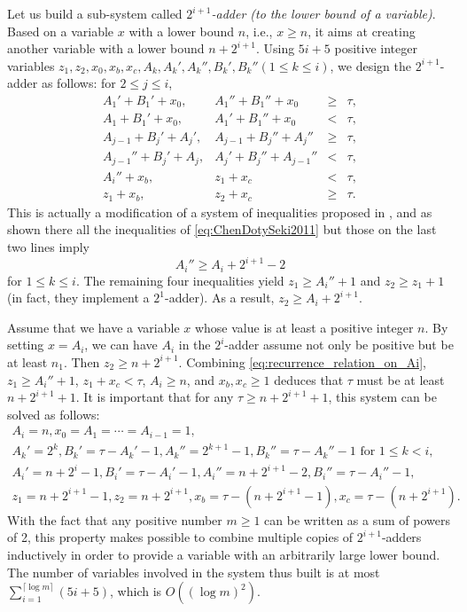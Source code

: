 \documentclass{article}
\theoremstyle{remark}
\theoremstyle{definition}
\begin{document}
Let us build a sub-system called {\it $2^{i+1}$-adder (to the lower bound of a variable)}.
Based on a variable $x$ with a lower bound $n$, i.e., $x \ge n$, it aims at creating another variable with a lower bound $n+2^{i+1}$. 
Using $5i{+}5$ positive integer variables $z_1, z_2, x_0, x_b, x_c, A_k, A_k', A_k'', B_k', B_k'' (1 \le k \le i)$, we design the $2^{i+1}$-adder as follows: for $2 \le j \le i$, 
\begin{equation}\label{eq:ChenDotySeki2011}
\begin{array}{llll}
	A_1' + B_1' + x_0, 	& A_1'' + B_1'' + x_0 		&\ge& \tau, \\
	A_1  + B_1' + x_0, 	& A_1' + B_1'' + x_0 		&<& \tau, \\
	A_{j-1} + B_j' + A_j', 	& A_{j-1} + B_j'' + A_j'' 	&\ge& \tau, \\
	A_{j-1}'' + B_j' + A_j, & A_j' + B_j'' + A_{j-1}'' 	&<& \tau, \\
	A_i'' + x_b, 		& z_1 + x_c 			&<& \tau, \\ 
	z_1 + x_b, 		& z_2 + x_c 			&\ge& \tau. 
\end{array}
\end{equation}
This is actually a modification of a system of inequalities proposed in \cite{ChenDotySeki2011}, and as shown there all the inequalities of \eqref{eq:ChenDotySeki2011} but those on the last two lines imply 
\begin{equation}\label{eq:recurrence_relation_on_Ai}
	A_i'' \ge A_i + 2^{i+1}-2 
\end{equation}
for $1 \le k \le i$. 
The remaining four inequalities yield $z_1 \ge A_i''+1$ and $z_2 \ge z_1 + 1$ (in fact, they implement a $2^1$-adder). 
As a result, $z_2 \ge A_i + 2^{i+1}$. 

Assume that we have a variable $x$ whose value is at least a positive integer $n$. 
By setting $x = A_i$, we can have $A_i$ in the $2^i$-adder assume not only be positive but be at least $n_1$. 
Then $z_2 \ge n + 2^{i+1}$. 
Combining \eqref{eq:recurrence_relation_on_Ai}, $z_1 \ge A_i''+1$, $z_1 + x_c < \tau$, $A_i \ge n$, and $x_b, x_c \ge 1$ deduces that $\tau$ must be at least $n + 2^{i+1}+1$. 
It is important that for any $\tau \ge n+2^{i+1}+1$, this system can be solved as follows: 
\[
\begin{array}{l}
	A_i = n, x_0 = A_1 = \cdots = A_{i-1} = 1, \\
	A_k' = 2^k, B_k' = \tau - A_k' -1, A_k'' = 2^{k+1}-1, B_k'' = \tau - A_k'' -1 \mbox{ for $1 \le k < i$}, \\
	A_i' = n + 2^i -1, B_i' = \tau - A_i' -1, A_i'' = n + 2^{i+1}-2, B_i'' = \tau - A_i'' -1, \\
	z_1 = n+2^{i+1}-1, z_2 = n+2^{i+1}, x_b = \tau - (n+2^{i+1}-1), x_c = \tau - (n+2^{i+1}). 
\end{array}
\]
With the fact that any positive number $m \ge 1$ can be written as a sum of powers of 2, this property makes possible to combine multiple copies of $2^{i+1}$-adders inductively in order to provide a variable with an arbitrarily large lower bound. 
The number of variables involved in the system thus built is at most $\sum_{i = 1}^{\lceil \log m \rceil} (5i+5)$, which is $O((\log m)^2)$. 
\end{document}
